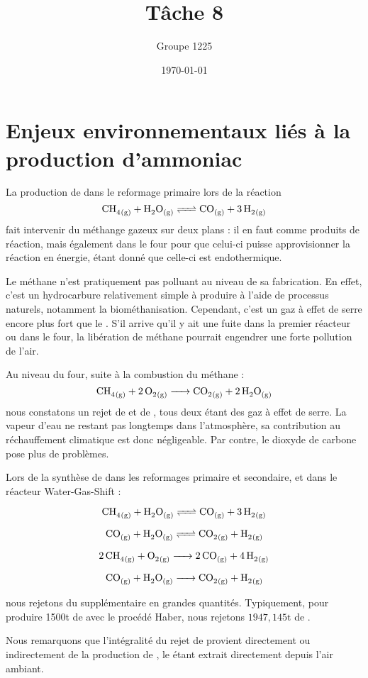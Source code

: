 \documentclass[a4paper, oneside, 12pt]{article}
\title{Tâche 8}
\author{Groupe 1225}
\date{\today}
\begin{document}
\maketitle

\section*{Enjeux environnementaux liés à la production d'ammoniac}

La production de  dans le reformage primaire lors de la réaction
\[ \ce{CH4_{(g)} + H2O_{(g)} <=> CO_{(g)} + 3 \, H2_{(g)}} \]
fait intervenir du méthange gazeux sur deux plans : il en faut comme produits de réaction,
mais également dans le four pour que celui-ci puisse approvisionner la réaction en énergie,
étant donné que celle-ci est endothermique. 

Le méthane n'est pratiquement pas polluant au niveau de sa fabrication. 
En effet, c'est un hydrocarbure relativement simple à produire à l'aide 
de processus naturels, notamment la biométhanisation. 
Cependant, c'est un gaz à effet de serre encore plus fort que le .
S'il arrive qu'il y ait une fuite dans la premier réacteur ou dans le four, 
la libération de méthane pourrait engendrer une forte pollution de l'air.

Au niveau du four, suite à la combustion du méthane : 
\[ \ce{CH4_{(g)} + 2 \, O2_{(g)} -> CO2_{(g)} + 2 \, H2O_{(g)}} \] 
nous constatons un rejet de  et de , 
tous deux étant des gaz à effet de serre. 
La vapeur d'eau ne restant pas longtemps dans l'atmosphère,
sa contribution au réchauffement climatique est donc négligeable.
Par contre, le dioxyde de carbone pose plus de problèmes. 

Lors de la synthèse de  dans les reformages primaire et secondaire, 
et dans le réacteur Water-Gas-Shift : 

\[ \ce{CH4_{(g)} + H2O_{(g)} <=> CO_{(g)} + 3 \, H2_{(g)}} \]

\[ \ce{CO_{(g)} + H2O_{(g)} <=> CO2_{(g)} + H2_{(g)}} \]

\[ \ce{2 \, CH4_{(g)} + O2_{(g)} -> {2} \, CO_{(g)} + 4 \, H2_{(g)}} \]
	
\[ \ce{CO_{(g)} + H2O_{(g)} -> CO2_{(g)} + H2_{(g)}} \]

nous rejetons du  supplémentaire en grandes quantités. 
Typiquement, pour produire 1500t de  avec le procédé Haber, 
nous rejetons $1947,145\si{\tonne}$ de .

Nous remarquons que l'intégralité du rejet de  provient directement 
ou indirectement de la production de , le  étant extrait 
directement depuis l'air ambiant.
\end{document}
